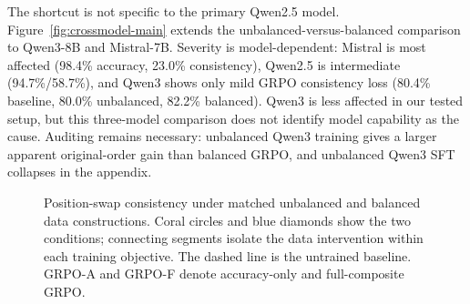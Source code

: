 \documentclass[11pt]{article}
\begin{document}
The shortcut is not specific to the primary Qwen2.5 model. Figure~\ref{fig:crossmodel-main} extends the unbalanced-versus-balanced comparison to Qwen3-8B and Mistral-7B. Severity is model-dependent: Mistral is most affected (98.4\% accuracy, 23.0\% consistency), Qwen2.5 is intermediate (94.7\%/58.7\%), and Qwen3 shows only mild GRPO consistency loss (80.4\% baseline, 80.0\% unbalanced, 82.2\% balanced). Qwen3 is less affected in our tested setup, but this three-model comparison does not identify model capability as the cause. Auditing remains necessary: unbalanced Qwen3 training gives a larger apparent original-order gain than balanced GRPO, and unbalanced Qwen3 SFT collapses in the appendix.

\begin{figure}[H]
\centering
{}
\caption{Position-swap consistency under matched unbalanced and balanced data constructions. Coral circles and blue diamonds show the two conditions; connecting segments isolate the data intervention within each training objective. The dashed line is the untrained baseline. GRPO-A and GRPO-F denote accuracy-only and full-composite GRPO.}
\label{fig:fix}
\end{figure}
\end{document}
